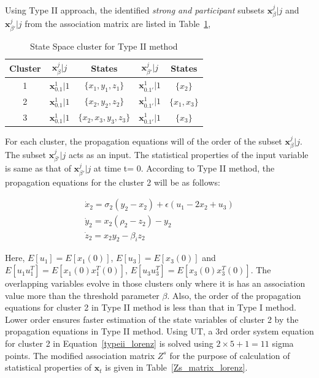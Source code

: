 Using Type II approach, the identified \textit{strong and participant} subsets $\textbf{x}_{\beta}^{j}|j$ and $\textbf{x}_{\beta'}^{j}|j$ from the association matrix are listed in Table~\ref{Type2_cluster_lorenz},

\begin{table}[H]
\centering
\caption{State Space cluster for Type II method}
\label{Type2_cluster_lorenz}
\begin{tabular}{c|c|c|c|c}
\hline 
Cluster & $\textbf{x}_{\beta}^{j}|j$ & States & $\textbf{x}_{\beta'}^{j}|j$ & States \\ 
\hline
1 & $\textbf{x}_{0.1}^{1}|1$ & $\lbrace x_1,y_1,z_1 \rbrace$ & $\textbf{x}_{0.1'}^{1}|1$ & $ \lbrace x_2 \rbrace$ \\ 
2 & $\textbf{x}_{0.1}^{1}|1$ & $\lbrace x_2,y_2,z_2 \rbrace$ & $\textbf{x}_{0.1'}^{1}|1$ & $\lbrace x_1,x_3 \rbrace$ \\ 
3 & $\textbf{x}_{0.1}^{1}|1$ & $\lbrace x_2, x_3, y_3, z_3 \rbrace$  & $\textbf{x}_{0.1'}^{1}|1$ & $\lbrace x_3 \rbrace$ \\ 
\hline 
\end{tabular} 
\end{table}

For each cluster, the propagation equations will of the order of the subset $\textbf{x}_{\beta}^{j}|j$. The subset $\textbf{x}_{\beta'}^{j}|j$ acts as an input. The statistical properties of the input variable is same as that of $\textbf{x}_{\beta'}^{j}|j$ at time t= 0. According to Type II method, the propagation equations for the cluster 2 will be as follows:

\begin{equation}
\label{typeii_lorenz}
\begin{array}{l}
\dot{x}_2 = \sigma_2(y_2 - x_2) +\epsilon(u_1 - 2x_2 + u_3) \\
\dot{y}_2 = x_2 (\rho_2 - z_2) - y_2 \\
\dot{z}_2 = x_2 y_2 - \beta_i z_2 
\end{array}
\end{equation}

Here, $E[u_1] = E[x_1 (0)] $, $E[u_3] = E[x_3 (0)] $ and $E[u_1 u_1^T] = E[x_1 (0)x_1^T (0)] $, $E[u_3 u_3^T] = E[x_3 (0)x_3^T (0)] $. The overlapping variables evolve in those clusters only where it is has an association value more than the threshold parameter $\beta$. Also, the order of the propagation equations for cluster 2 in Type II method is less than that in Type I method. Lower order ensures faster estimation of the state variables of cluster 2 by the propagation equations in Type II method. Using UT, a 3rd order system equation for cluster 2 in Equation~\ref{typeii_lorenz} is solved using $2 \times 5 +1 = 11$ sigma points. The modified association matrix $Z^s$ for the purpose of calculation of statistical properties of $\textbf{x}_t$ is given in Table~\ref{Zs_matrix_lorenz}. 

